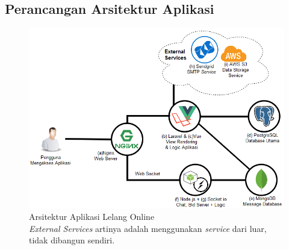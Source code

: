 \subsection{Perancangan Arsitektur Aplikasi}
	
      \begin{figure}[H]
        \centering
        \includegraphics[width=\textwidth]{images/bab3/diagram/arsitektur-awal.png}
        \caption{Arsitektur Aplikasi Lelang Online 
        		\\
                \textit{External Services} artinya adalah menggunakan \textit{service} dari luar, tidak dibangun sendiri. }
        \label{arsitektur-app-final}
      \end{figure}
    
